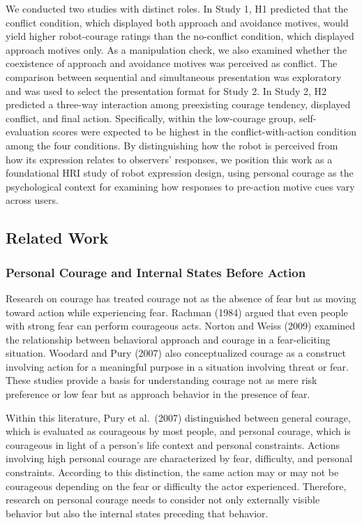 \documentclass[
]{article}
\begin{document}
We conducted two studies with distinct roles. In Study 1, H1 predicted
that the conflict condition, which displayed both approach and avoidance
motives, would yield higher robot-courage ratings than the no-conflict
condition, which displayed approach motives only. As a manipulation
check, we also examined whether the coexistence of approach and
avoidance motives was perceived as conflict. The comparison between
sequential and simultaneous presentation was exploratory and was used to
select the presentation format for Study 2. In Study 2, H2 predicted a
three-way interaction among preexisting courage tendency, displayed
conflict, and final action. Specifically, within the low-courage group,
self-evaluation scores were expected to be highest in the
conflict-with-action condition among the four conditions. By
distinguishing how the robot is perceived from how its expression
relates to observers' responses, we position this work as a foundational
HRI study of robot expression design, using personal courage as the
psychological context for examining how responses to pre-action motive
cues vary across users.

\subsection{Related Work}\label{related-work}

\subsubsection{Personal Courage and Internal States Before
Action}\label{personal-courage-and-internal-states-before-action}

Research on courage has treated courage not as the absence of fear but
as moving toward action while experiencing fear. Rachman (1984) argued
that even people with strong fear can perform courageous acts. Norton
and Weiss (2009) examined the relationship between behavioral approach
and courage in a fear-eliciting situation. Woodard and Pury (2007) also
conceptualized courage as a construct involving action for a meaningful
purpose in a situation involving threat or fear. These studies provide a
basis for understanding courage not as mere risk preference or low fear
but as approach behavior in the presence of fear.

Within this literature, Pury et al.~(2007) distinguished between general
courage, which is evaluated as courageous by most people, and personal
courage, which is courageous in light of a person's life context and
personal constraints. Actions involving high personal courage are
characterized by fear, difficulty, and personal constraints. According
to this distinction, the same action may or may not be courageous
depending on the fear or difficulty the actor experienced. Therefore,
research on personal courage needs to consider not only externally
visible behavior but also the internal states preceding that behavior.
\end{document}
